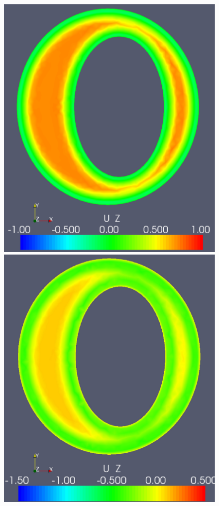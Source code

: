\begin{figure}
{            \includegraphics[width=\threefigsfull]{chapters/hentschel/pdf/pulse_f1_08_elliptic_sysdia_nmb18.pdf}
            \includegraphics[width=\threefigsfull]{chapters/hentschel/pdf/pulse_f1_08_elliptic_diamin1_nmb25.pdf}}
\end{figure}

